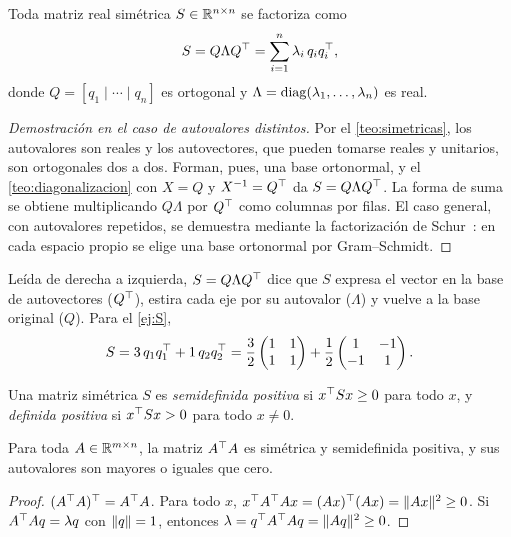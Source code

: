 \begin{teorema}\label{teo:espectral}
Toda matriz real simétrica $S\in\mathbb{R}^{n\times n}$ se factoriza como
\[
S=Q\Lambda Q^{\top}=\sum_{i=1}^{n}\lambda_i\,q_iq_i^{\top},
\]
donde $Q=[q_1\mid\cdots\mid q_n]$ es ortogonal y $\Lambda=\operatorname{diag}(\lambda_1,\dots,\lambda_n)$ es real.
\end{teorema}

\begin{proof}[Demostración en el caso de autovalores distintos]
Por el \cref{teo:simetricas}, los autovalores son reales y los autovectores, que pueden tomarse reales y unitarios, son ortogonales dos a dos. Forman, pues, una base ortonormal, y el \cref{teo:diagonalizacion} con $X=Q$ y $X^{-1}=Q^{\top}$ da $S=Q\Lambda Q^{\top}$. La forma de suma se obtiene multiplicando $Q\Lambda$ por $Q^{\top}$ como columnas por filas. El caso general, con autovalores repetidos, se demuestra mediante la factorización de Schur~\cite[§6.3]{strang-ila}: en cada espacio propio se elige una base ortonormal por Gram--Schmidt.
\end{proof}

Leída de derecha a izquierda, $S=Q\Lambda Q^{\top}$ dice que $S$ expresa el vector en la base de autovectores ($Q^{\top}$), estira cada eje por su autovalor ($\Lambda$) y vuelve a la base original ($Q$). Para el \cref{ej:S},
\[
S=3\,q_1q_1^{\top}+1\,q_2q_2^{\top}=\frac{3}{2}\begin{pmatrix}1&1\\1&1\end{pmatrix}+\frac{1}{2}\begin{pmatrix}1&-1\\-1&1\end{pmatrix}.
\]

\begin{definicion}
Una matriz simétrica $S$ es \emph{semidefinida positiva} si $x^{\top} Sx\ge 0$ para todo $x$, y \emph{definida positiva} si $x^{\top} Sx>0$ para todo $x\ne 0$.
\end{definicion}

\begin{proposicion}\label{prop:AtA}
Para toda $A\in\mathbb{R}^{m\times n}$, la matriz $A^{\top} A$ es simétrica y semidefinida positiva, y sus autovalores son mayores o iguales que cero.
\end{proposicion}

\begin{proof}
$(A^{\top} A)^{\top}=A^{\top} A$. Para todo $x$, $x^{\top} A^{\top} Ax=(Ax)^{\top}(Ax)=\lVert Ax\rVert^{2}\ge 0$. Si $A^{\top} Aq=\lambda q$ con $\lVert q\rVert=1$, entonces $\lambda=q^{\top} A^{\top} Aq=\lVert Aq\rVert^{2}\ge 0$.
\end{proof}


